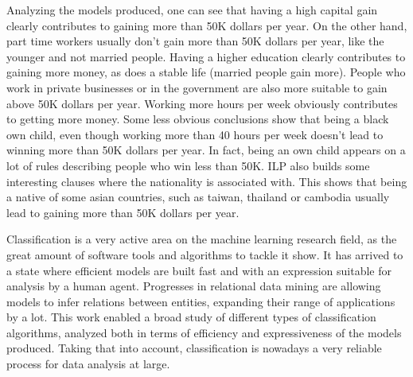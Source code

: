 \documentclass[a4paper]{llncs}
\begin{document}
Analyzing the models produced, one can see that having a high capital gain 
clearly contributes to gaining more than 50K dollars per year. On the other
hand, part time workers usually don't gain more than 50K dollars per year, like
the younger and not married people. Having a higher education clearly 
contributes to gaining more money, as does a stable life (married people
gain more). People who work in private businesses or in the government are also
more suitable to gain above 50K dollars per year. Working more hours per week
obviously contributes to getting more money. Some less obvious conclusions show 
that being a black own child, even though working more than 40 hours per week 
doesn't lead to winning more than 50K dollars per year. In fact, being an own 
child appears on a lot of rules describing people who win less than 50K. ILP
also builds some interesting clauses where the nationality is associated with.
This shows that being a native of some asian countries, such as taiwan, thailand
or cambodia usually lead to gaining more than 50K dollars per year.

Classification is a very active area on the machine learning research field, as
the great amount of software tools and algorithms to tackle it show. It has
arrived to a state where efficient models are built fast and with an expression
suitable for analysis by a human agent. Progresses in relational data mining are
allowing models to infer relations between entities, expanding their range of 
applications by a lot. This work enabled a broad study of different types of 
classification algorithms, analyzed both in terms of efficiency and 
expressiveness of the models produced. Taking that into account, classification
is nowadays a very reliable process for data analysis at large.
\end{document}
